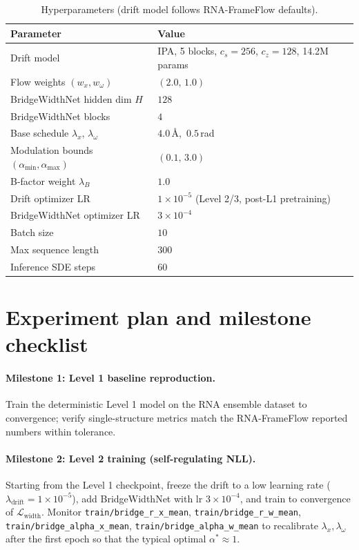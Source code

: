 \documentclass{article}
\theoremstyle{remark}
\theoremstyle{definition}
\begin{document}
\begin{table}[h]
\centering
\small
\caption{Hyperparameters (drift model follows RNA-FrameFlow defaults).}
\begin{tabular}{ll}
\toprule
Parameter & Value \\
\midrule
Drift model & IPA, 5 blocks, $c_s=256$, $c_z=128$, 14.2M params \\
Flow weights $(w_x,w_\omega)$ & $(2.0,\,1.0)$ \\
BridgeWidthNet hidden dim $H$ & $128$ \\
BridgeWidthNet blocks & $4$ \\
Base schedule $\lambda_x$, $\lambda_\omega$ & $4.0$\,\AA,\ $0.5$\,rad \\
Modulation bounds $(\alpha_{\min},\alpha_{\max})$ & $(0.1,\,3.0)$ \\
B-factor weight $\lambda_B$ & $1.0$ \\
Drift optimizer LR & $1\times 10^{-5}$ (Level 2/3, post-L1 pretraining) \\
BridgeWidthNet optimizer LR & $3\times 10^{-4}$ \\
Batch size & $10$ \\
Max sequence length & $300$ \\
Inference SDE steps & $60$ \\
\bottomrule
\end{tabular}
\end{table}

\section{Experiment plan and milestone checklist}
\label{app:plan}

\paragraph{Milestone 1: Level 1 baseline reproduction.}
Train the deterministic Level 1 model on the RNA ensemble dataset to
convergence; verify single-structure metrics match the RNA-FrameFlow reported
numbers within tolerance.

\paragraph{Milestone 2: Level 2 training (self-regulating NLL).}
Starting from the Level 1 checkpoint, freeze the drift to a low learning rate
($\lambda_{\text{drift}}=1\times 10^{-5}$), add BridgeWidthNet with lr
$3\times 10^{-4}$, and train to convergence of $\mathcal{L}_{\text{width}}$.
Monitor \texttt{train/bridge\_r\_x\_mean}, \texttt{train/bridge\_r\_w\_mean},
\texttt{train/bridge\_alpha\_x\_mean}, \texttt{train/bridge\_alpha\_w\_mean}
to recalibrate $\lambda_x,\lambda_\omega$ after the first epoch so that the
typical optimal $\alpha^{\ast}\approx 1$.
\end{document}
